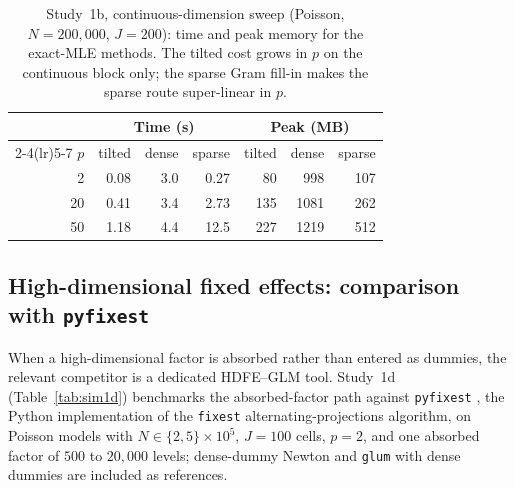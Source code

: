 \documentclass[11pt]{article}
\begin{document}
\begin{table}[t]
\centering
\caption{Study~1b, continuous-dimension sweep (Poisson, $N = 200{,}000$,
$J = 200$): time and peak memory for the exact-MLE methods.  The tilted
cost grows in $p$ on the continuous block only; the sparse Gram fill-in
makes the sparse route super-linear in $p$.}
\label{tab:sim1p}
\small
\begin{tabular}{rrrrrrr}
\toprule
& \multicolumn{3}{c}{Time (s)} & \multicolumn{3}{c}{Peak (MB)} \\
\cmidrule(lr){2-4}\cmidrule(lr){5-7}
$p$ & tilted & dense & sparse & tilted & dense & sparse \\
\midrule
2  & 0.08 & 3.0 & 0.27 & 80  & 998  & 107 \\
20 & 0.41 & 3.4 & 2.73 & 135 & 1081 & 262 \\
50 & 1.18 & 4.4 & 12.5 & 227 & 1219 & 512 \\
\bottomrule
\end{tabular}
\end{table}

\subsection{High-dimensional fixed effects: comparison with
\texttt{pyfixest}}\label{sec:sim-hdfe}

When a high-dimensional factor is absorbed rather than entered as
dummies, the relevant competitor is a dedicated HDFE--GLM tool.  Study~1d
(Table~\ref{tab:sim1d}) benchmarks the absorbed-factor path against
\texttt{pyfixest} \citep{berge2018}, the Python implementation of the
\texttt{fixest} alternating-projections algorithm, on Poisson models with
$N \in \{2, 5\}\times10^5$, $J = 100$ cells, $p = 2$, and one absorbed
factor of $500$ to $20{,}000$ levels; dense-dummy Newton and \texttt{glum}
with dense dummies are included as references.
\end{document}
